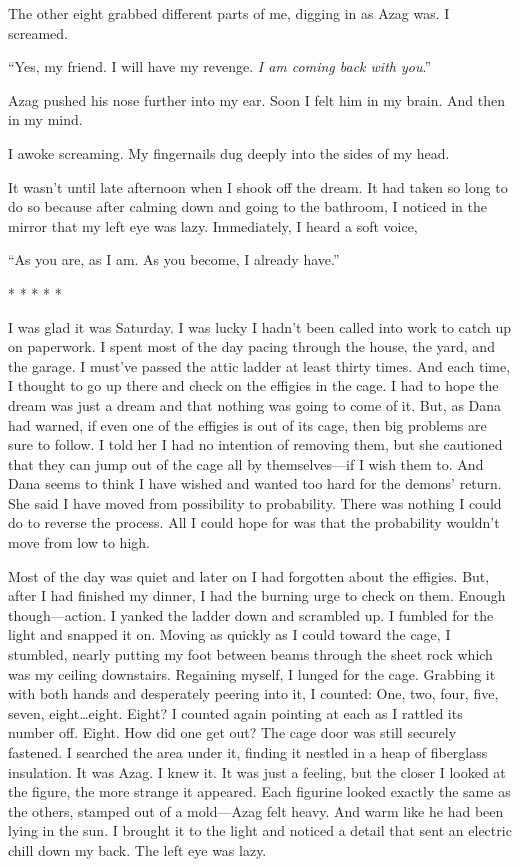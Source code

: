 The other eight grabbed different parts of me, digging in as Azag was. I
screamed.

``Yes, my friend. I will have my revenge. \emph{I am coming back with
you}.''

Azag pushed his nose further into my ear. Soon I felt him in my brain.
And then in my mind.

I awoke screaming. My fingernails dug deeply into the sides of my head.

It wasn't until late afternoon when I shook off the dream. It had taken
so long to do so because after calming down and going to the bathroom, I
noticed in the mirror that my left eye was lazy. Immediately, I heard a
soft voice,

``As you are, as I am. As you become, I already have.''

* * * * *

I was glad it was Saturday. I was lucky I hadn't been called into work
to catch up on paperwork. I spent most of the day pacing through the
house, the yard, and the garage. I must've passed the attic ladder at
least thirty times. And each time, I thought to go up there and check on
the effigies in the cage. I had to hope the dream was just a dream and
that nothing was going to come of it. But, as Dana had warned, if even
one of the effigies is out of its cage, then big problems are sure to
follow. I told her I had no intention of removing them, but she
cautioned that they can jump out of the cage all by themselves---if I
wish them to. And Dana seems to think I have wished and wanted too hard
for the demons' return. She said I have moved from possibility to
probability. There was nothing I could do to reverse the process. All I
could hope for was that the probability wouldn't move from low to high.

Most of the day was quiet and later on I had forgotten about the
effigies. But, after I had finished my dinner, I had the burning urge to
check on them. Enough though---action. I yanked the ladder down and
scrambled up. I fumbled for the light and snapped it on. Moving as
quickly as I could toward the cage, I stumbled, nearly putting my foot
between beams through the sheet rock which was my ceiling downstairs.
Regaining myself, I lunged for the cage. Grabbing it with both hands and
desperately peering into it, I counted: One, two, four, five, seven,
eight\ldots eight. Eight? I counted again pointing at each as I rattled
its number off. Eight. How did one get out? The cage door was still
securely fastened. I searched the area under it, finding it nestled in a
heap of fiberglass insulation. It was Azag. I knew it. It was just a
feeling, but the closer I looked at the figure, the more strange it
appeared. Each figurine looked exactly the same as the others, stamped
out of a mold---Azag felt heavy. And warm like he had been lying in the
sun. I brought it to the light and noticed a detail that sent an
electric chill down my back. The left eye was lazy.

